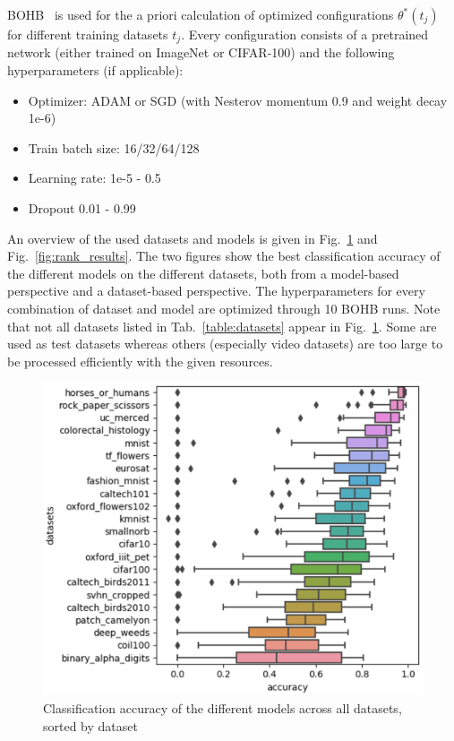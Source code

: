 \documentclass{article}
\begin{document}
BOHB~\cite{falkner18} is used for the a priori calculation of optimized configurations $\theta^*(t_j)$ for different training datasets $t_j$. Every configuration consists of a pretrained network (either trained on ImageNet or CIFAR-100) and the following hyperparameters (if applicable):
%
\begin{itemize}
\item Optimizer: ADAM or SGD (with Nesterov momentum 0.9 and weight decay 1e-6)
\item Train batch size: 16/32/64/128
\item Learning rate: 1e-5 - 0.5
\item Dropout 0.01 - 0.99
\end{itemize}
%
An overview of the used datasets and models is given in Fig.~\ref{fig:dataset_results} and Fig.~\ref{fig:rank_results}. The two figures show the best classification accuracy of the different models on the different datasets, both from a model-based perspective and a dataset-based perspective. The hyperparameters for every combination of dataset and model are optimized through 10 BOHB runs. Note that not all datasets listed in Tab.~\ref{table:datasets} appear in Fig.~\ref{fig:dataset_results}. Some are used as test datasets whereas others (especially video datasets) are too large to be processed efficiently with the given resources.

\begin{figure}[htb]
\begin{center}
 	\includegraphics[width=0.85\linewidth]{../figures/dataset_results.eps} 
\end{center}
\caption{Classification accuracy of the different models across all datasets, sorted by dataset}
\label{fig:dataset_results}
\end{figure} 
\end{document}
